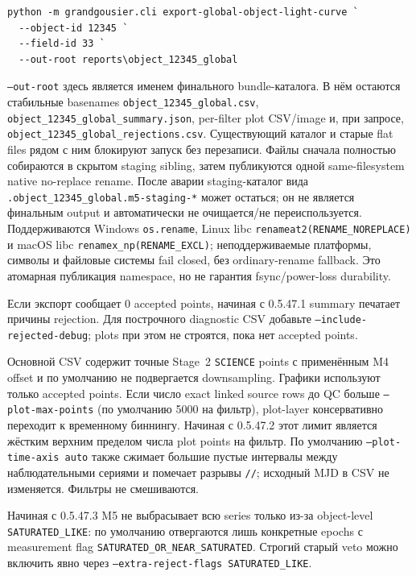 \begin{lstlisting}
python -m grandgousier.cli export-global-object-light-curve `
  --object-id 12345 `
  --field-id 33 `
  --out-root reports\object_12345_global
\end{lstlisting}

\texttt{--out-root} здесь является именем финального bundle-каталога. В нём остаются
стабильные basenames \texttt{object\_12345\_global.csv},
\texttt{object\_12345\_global\_summary.json}, per-filter plot CSV/image и, при запросе,
\texttt{object\_12345\_global\_rejections.csv}. Существующий каталог и старые flat
files рядом с ним блокируют запуск без перезаписи. Файлы сначала полностью собираются в
скрытом staging sibling, затем публикуются одной same-filesystem native no-replace rename.
После аварии staging-каталог вида \texttt{.object\_12345\_global.m5-staging-*} может
остаться; он не является финальным output и автоматически не очищается/не переиспользуется.
Поддерживаются Windows \texttt{os.rename}, Linux libc
\texttt{renameat2(RENAME\_NOREPLACE)} и macOS libc \texttt{renamex\_np(RENAME\_EXCL)};
неподдерживаемые платформы, символы и файловые системы fail closed, без ordinary-rename
fallback. Это атомарная публикация namespace, но не гарантия fsync/power-loss durability.

Если экспорт сообщает 0 accepted points, начиная с 0.5.47.1 summary печатает причины rejection. Для построчного diagnostic CSV добавьте \texttt{--include-rejected-debug}; plots при этом не строятся, пока нет accepted points.

Основной CSV содержит точные Stage~2 \texttt{SCIENCE} points с применённым M4 offset и по умолчанию не подвергается downsampling. Графики используют только accepted points. Если число exact linked source rows до QC больше \texttt{--plot-max-points} (по умолчанию 5000 на фильтр), plot-layer консервативно переходит к временному биннингу. Начиная с 0.5.47.2 этот лимит является жёстким верхним пределом числа plot points на фильтр. По умолчанию \texttt{--plot-time-axis auto} также сжимает большие пустые интервалы между наблюдательными сериями и помечает разрывы \texttt{//}; исходный MJD в CSV не изменяется. Фильтры не смешиваются.

Начиная с 0.5.47.3 M5 не выбрасывает всю series только из-за object-level \texttt{SATURATED\_LIKE}: по умолчанию отвергаются лишь конкретные epochs с measurement flag \texttt{SATURATED\_OR\_NEAR\_SATURATED}. Строгий старый veto можно включить явно через \texttt{--extra-reject-flags SATURATED\_LIKE}.


